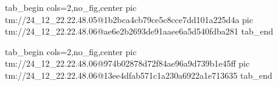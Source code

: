  
 
 
 
 

\qqSecCmtScr


\ifcmt
  tab_begin cols=2,no_fig,center
    pic tm://24_12_22.22.48.05@1b2bca4cb79ce5c8cce7dd101a225d4a
    pic tm://24_12_22.22.48.06@ae6e2b2693de91aaee6a5d540fdba281
  tab_end
\fi


\ifcmt
  tab_begin cols=2,no_fig,center
    pic tm://24_12_22.22.48.06@974b02878d72f84ae96a9d739b1e45ff
    pic tm://24_12_22.22.48.06@13ee4dfab571c1a230a6922a1e713635
  tab_end
\fi

